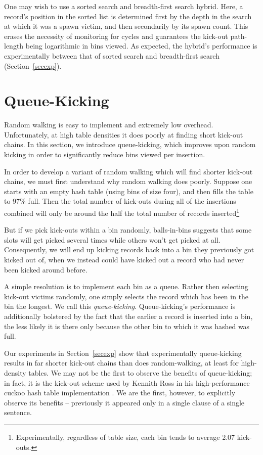 \documentclass{sig-alternate-05-2015}
\begin{document}
One may wish to use a sorted search and breadth-first search
hybrid. Here, a record's position in the sorted list is determined
first by the depth in the search at which it was a spawn victim, and
then secondarily by its spawn count. This erases the necessity of
monitoring for cycles and guarantees the kick-out path-length being
logarithmic in bins viewed. As expected, the hybrid's performance
is experimentally between that of sorted search and breadth-first
search (Section~\ref{secexp}).





\section{Queue-Kicking} \label{sec_queue_walk} 

Random walking is easy to implement and extremely low
overhead. Unfortunately, at high table densities it does poorly at
finding short kick-out chains. In this section, we introduce
queue-kicking, which improves upon random kicking in order to
significantly reduce bins viewed per insertion.

In order to develop a variant of random walking which will find
shorter kick-out chains, we must first understand why random walking
does poorly. Suppose one starts with an empty hash table (using bins
of size four), and then fills the table to 97\% full. Then the total
number of kick-outs during all of the insertions combined will only be
around the half the total number of records
inserted\footnote{Experimentally, regardless of table size, each bin
  tends to average 2.07 kick-outs.}


But if we pick kick-outs within a bin randomly, balls-in-bins
suggests that some slots will get picked several times while others
won't get picked at all. Consequently, we will end up kicking records
back into a bin they previously got kicked out of, when we instead
could have kicked out a record who had never been kicked around
before.

A simple resolution is to implement each bin as a queue. Rather then
selecting kick-out victims randomly, one simply selects the record
which has been in the bin the longest. We call this
\emph{queue-kicking}. Queue-kicking's performance is additionally
bolstered by the fact that the earlier a record is inserted into a
bin, the less likely it is there only because the
other bin to which it was hashed was full.

Our experiments in Section~\ref{secexp} show that experimentally
queue-kicking results in far shorter kick-out chains than does
random-walking, at least for high-density tables. We may not be the
first to observe the benefits of queue-kicking; in fact, it is the
kick-out scheme used by Kennith Ross in his high-performance cuckoo
hash table implementation \cite{ross07}. We are the first, however, to
explicitly observe its benefits -- previously it appeared only in a
single clause of a single sentence.
\end{document}
